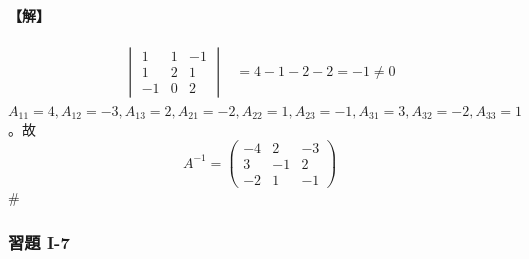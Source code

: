 \paragraph{【解】}
\begin{align*}
\begin{vmatrix}
1 & 1 & -1 \\
1 & 2 & 1 \\
-1 & 0 & 2
\end{vmatrix} &= 4 - 1 - 2 - 2 = -1 \ne 0
\end{align*}
$A_{11}=4, A_{12}=-3, A_{13}=2, A_{21}=-2, A_{22}=1, A_{23}=-1, A_{31}=3, A_{32}=-2, A_{33}=1$。故
\[ A^{-1} = \begin{pmatrix}
-4 & 2 & -3 \\
3 & -1 & 2 \\
-2 & 1 & -1
\end{pmatrix} \]\hfill$\#$

\subsubsection*{習題 I-7}\label{sec:b6s-ex1-7}


